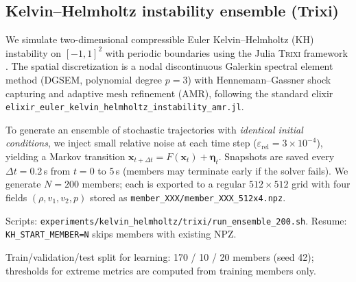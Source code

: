 
\subsection{Kelvin--Helmholtz instability ensemble (Trixi)}
\label{subsec:kh_methods}

We simulate two-dimensional compressible Euler Kelvin--Helmholtz (KH) instability on $[-1,1]^2$ with periodic boundaries using the Julia \textsc{Trixi} framework \citep{ranocha2022trixi}.
The spatial discretization is a nodal discontinuous Galerkin spectral element method (DGSEM, polynomial degree $p=3$) with Hennemann--Gassner shock capturing and adaptive mesh refinement (AMR), following the standard elixir \texttt{elixir\_euler\_kelvin\_helmholtz\_instability\_amr.jl}.

To generate an ensemble of stochastic trajectories with \emph{identical initial conditions}, we inject small relative noise at each time step ($\varepsilon_{\mathrm{rel}}=3\times10^{-4}$), yielding a Markov transition
$\mathbf{x}_{t+\Delta t}=F(\mathbf{x}_t)+\boldsymbol{\eta}_t$.
Snapshots are saved every $\Delta t=0.2$\,s from $t=0$ to $5$\,s (members may terminate early if the solver fails).
We generate $N=200$ members; each is exported to a regular $512\times512$ grid with four fields $(\rho,v_1,v_2,p)$ stored as \texttt{member\_XXX/member\_XXX\_512x4.npz}.

Scripts: \texttt{experiments/kelvin\_helmholtz/trixi/run\_ensemble\_200.sh}.
Resume: \texttt{KH\_START\_MEMBER=N} skips members with existing NPZ.

Train/validation/test split for learning: 170 / 10 / 20 members (seed 42); thresholds for extreme metrics are computed from training members only.
